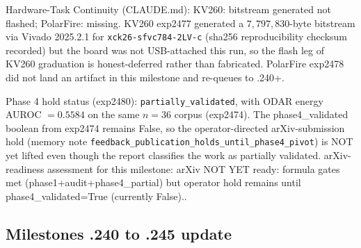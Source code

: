 \documentclass[10pt]{article}
\begin{document}
Hardware-Task Continuity (CLAUDE.md): KV260: bitstream generated not flashed; PolarFire: missing. KV260
exp2477 generated a $7{,}797{,}830$-byte bitstream via Vivado
2025.2.1 for \texttt{xck26-sfvc784-2LV-c} (sha256 reproducibility
checksum recorded) but the board was not USB-attached this run, so
the flash leg of KV260 graduation is honest-deferred rather than
fabricated. PolarFire exp2478 did not land an artifact in this
milestone and re-queues to .240+.

Phase 4 hold status (exp2480): \texttt{partially\_validated}, with ODAR
energy AUROC $= 0.5584$ on the same $n=36$ corpus (exp2474). The
phase4\_validated boolean from exp2474 remains False, so the
operator-directed arXiv-submission hold (memory note
\texttt{feedback\_publication\_holds\_until\_phase4\_pivot})
is NOT yet lifted even though the report classifies the work as
partially validated. arXiv-readiness assessment for this milestone:
arXiv NOT YET ready: formula gates met (phase1+audit+phase4\_partial) but operator hold remains until phase4\_validated=True (currently False)..

\subsection{Milestones .240 to .245 update}
\end{document}
